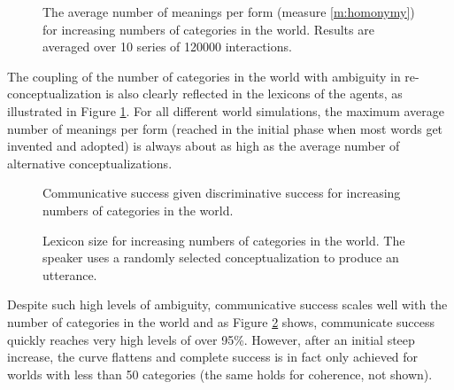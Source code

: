 \startfiguregroup

\begin{figure}[t]
  \caption{The average number of meanings per form (measure
    \ref{m:homonymy}) for increasing numbers of categories in the
    world. Results are averaged over 10 series of 120000
    interactions.}
  \label{f:sgg-sw-unstructured-number-of-attributes-vs-homonymy}
\end{figure}

The coupling of the number of categories in the world with ambiguity
in re-conceptualization is also clearly reflected in the lexicons of
the agents, as illustrated in Figure
\ref{f:sgg-sw-unstructured-number-of-attributes-vs-homonymy}. For all
different world simulations, the maximum average number of meanings
per form (reached in the initial phase when most words get invented
and adopted) is always about as high as the average number of
alternative conceptualizations.


\begin{figure}[t]
  \caption{Communi\-cative success given discriminative success for
    increasing numbers of categories in the world.}
  \label{f:sgg-sw-unstructured-number-of-attributes-vs-communicative-success-given-discriminative-success}
\end{figure}
  
\begin{figure}[t]
  \caption{Lexicon size for increasing numbers of categories in the
    world. The speaker uses a randomly selected conceptualization to
    produce an utterance. }
  \label{f:sgg-sw-unstructured-number-of-attributes-vs-lexicon-size}
\end{figure}

\stopfiguregroup

Despite such high levels of ambiguity, communicative success scales
well with the number of categories in the world and as Figure
\ref{f:sgg-sw-unstructured-number-of-attributes-vs-communicative-success-given-discriminative-success}
shows, communicate success quickly reaches very high levels of over
95\%. However, after an initial steep increase, the curve flattens and
complete success is in fact only achieved for worlds with less than 50
categories (the same holds for coherence, not shown). 

